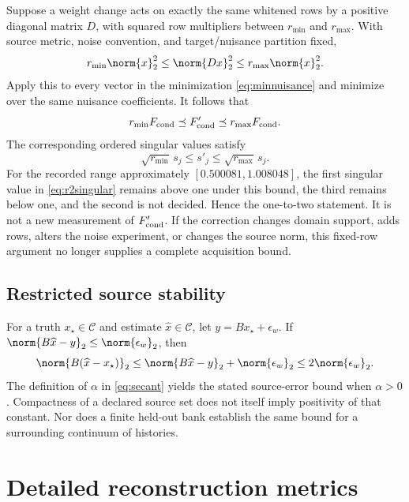 Suppose a weight change acts on exactly the same whitened rows by a positive diagonal matrix $D$, with squared row multipliers between $r_{\min}$ and $r_{\max}$. With source metric, noise convention, and target/nuisance partition fixed,
\begin{equation}
r_{\min}\norm{x}_2^2\leq\norm{Dx}_2^2\leq r_{\max}\norm{x}_2^2.
\end{equation}
Apply this to every vector in the minimization \eqref{eq:minnuisance} and minimize over the same nuisance coefficients. It follows that
\begin{equation}
r_{\min}F_{\rm cond}\preceq F'_{\rm cond}\preceq r_{\max}F_{\rm cond}.
\label{eq:reweightloewner}
\end{equation}
The corresponding ordered singular values satisfy
\begin{equation}
\sqrt{r_{\min}}\,s_j\leq s'_j\leq\sqrt{r_{\max}}\,s_j.
\label{eq:weylbound}
\end{equation}
For the recorded range approximately $[0.500081,1.008048]$, the first singular value in \eqref{eq:r2singular} remains above one under this bound, the third remains below one, and the second is not decided. Hence the one-to-two statement. It is not a new measurement of $F'_{\rm cond}$. If the correction changes domain support, adds rows, alters the noise experiment, or changes the source norm, this fixed-row argument no longer supplies a complete acquisition bound.

\subsection{Restricted source stability}
For a truth $x_\star\in\mathcal C$ and estimate $\widehat x\in\mathcal C$, let $y=Bx_\star+\epsilon_w$. If $\norm{B\widehat x-y}_2\leq\norm{\epsilon_w}_2$, then
\begin{equation}
\norm{B(\widehat x-x_\star)}_2
\leq\norm{B\widehat x-y}_2+\norm{\epsilon_w}_2
\leq2\norm{\epsilon_w}_2.
\end{equation}
The definition of $\alpha$ in \eqref{eq:secant} yields the stated source-error bound when $\alpha>0$. Compactness of a declared source set does not itself imply positivity of that constant. Nor does a finite held-out bank establish the same bound for a surrounding continuum of histories.

\section{Detailed reconstruction metrics}\label{app:metrics}
